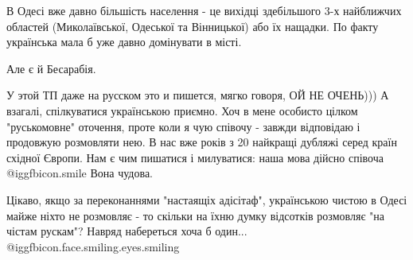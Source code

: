  

В Одесі вже давно більшість населення - це вихідці здебільшого 3-х найближчих
областей (Миколаївської, Одеської та Вінницької) або їх нащадки. По факту
українська мала б уже давно домінувати в місті.

\begin{itemize} %
 
Але є й Бесарабія.
\end{itemize} %

 

\obeycr
У этой ТП даже на русском это и пишется, мягко говоря, ОЙ НЕ ОЧЕНЬ)))
А взагалі, спілкуватися українською приємно. Хоч в мене особисто цілком "руськомовне" оточення, проте коли я чую співочу - завжди відповідаю і продовжую розмовляти нею.
В нас вже років з 20 найкращі дубляжі серед країн східної Європи.
Нам є чим пишатися і милуватися:
наша мова дійсно співоча  @igg{fbicon.smile} 
Вона чудова.
\restorecr

 
Цікаво, якщо за переконаннями "настаящіх адісітаф", українською чистою в Одесі
майже ніхто не розмовляє - то скільки на їхню думку відсотків розмовляє "на
чістам рускам"? Навряд набереться хоча б один...  @igg{fbicon.face.smiling.eyes.smiling} 

